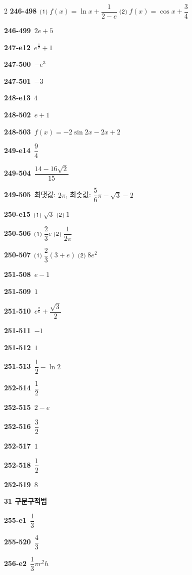 \documentclass[10pt,a4paper]{article}
\begin{document}
\begin{multicols}{2}
\noindent\textbf{246-498}\ ⑴ $f(x)=\ln x+\dfrac{1}{2-e}$ ⑵ $f(x)=\cos x+\dfrac{3}{4}$\par
\noindent\textbf{246-499}\ $2e+5$\par
\noindent\textbf{247-e12}\ $e^{\frac{\pi}{2}}+1$\par
\noindent\textbf{247-500}\ $-e^3$\par
\noindent\textbf{247-501}\ $-3$\par
\noindent\textbf{248-e13}\ $4$\par
\noindent\textbf{248-502}\ $e+1$\par
\noindent\textbf{248-503}\ $f(x)=-2\sin 2x-2x+2$\par
\noindent\textbf{249-e14}\ $\dfrac{9}{4}$\par
\noindent\textbf{249-504}\ $\dfrac{14-16\sqrt{2}}{15}$\par
\noindent\textbf{249-505}\ 최댓값: $2\pi$, 최솟값: $\dfrac{5}{6}\pi-\sqrt{3}-2$\par
\noindent\textbf{250-e15}\ ⑴ $\sqrt{3}$ ⑵ $1$\par
\noindent\textbf{250-506}\ ⑴ $\dfrac{2}{3}e$ ⑵ $\dfrac{1}{2\pi}$\par
\noindent\textbf{250-507}\ ⑴ $\dfrac{2}{3}(3+e)$ ⑵ $8e^2$\par
\noindent\textbf{251-508}\ $e-1$\par
\noindent\textbf{251-509}\ $1$\par
\noindent\textbf{251-510}\ $e^{\frac{\pi}{6}}+\dfrac{\sqrt{3}}{2}$\par
\noindent\textbf{251-511}\ $-1$\par
\noindent\textbf{251-512}\ $1$\par
\noindent\textbf{251-513}\ $\dfrac{1}{2}-\ln 2$\par
\noindent\textbf{252-514}\ $\dfrac{1}{2}$\par
\noindent\textbf{252-515}\ $2-e$\par
\noindent\textbf{252-516}\ $\dfrac{3}{2}$\par
\noindent\textbf{252-517}\ $1$\par
\noindent\textbf{252-518}\ $\dfrac{1}{2}$\par
\noindent\textbf{252-519}\ $8$\par
\noindent\textbf{31 구분구적법}\par\smallskip
\noindent\textbf{255-e1}\ $\dfrac{1}{3}$\par
\noindent\textbf{255-520}\ $\dfrac{4}{3}$\par
\noindent\textbf{256-e2}\ $\dfrac{1}{3}\pi r^2 h$\par

\end{multicols}
\end{document}
